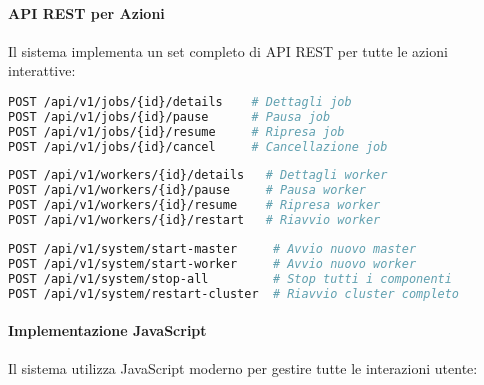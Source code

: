 \documentclass[12pt,a4paper]{article}
\begin{document}
\paragraph{API REST per Azioni}
Il sistema implementa un set completo di API REST per tutte le azioni interattive:

\begin{lstlisting}[language=bash, caption=API Endpoints per Azioni Job]
POST /api/v1/jobs/{id}/details    # Dettagli job
POST /api/v1/jobs/{id}/pause      # Pausa job
POST /api/v1/jobs/{id}/resume     # Ripresa job
POST /api/v1/jobs/{id}/cancel     # Cancellazione job
\end{lstlisting}

\begin{lstlisting}[language=bash, caption=API Endpoints per Azioni Worker]
POST /api/v1/workers/{id}/details   # Dettagli worker
POST /api/v1/workers/{id}/pause     # Pausa worker
POST /api/v1/workers/{id}/resume    # Ripresa worker
POST /api/v1/workers/{id}/restart   # Riavvio worker
\end{lstlisting}

\begin{lstlisting}[language=bash, caption=API Endpoints per Controllo Sistema]
POST /api/v1/system/start-master     # Avvio nuovo master
POST /api/v1/system/start-worker     # Avvio nuovo worker
POST /api/v1/system/stop-all         # Stop tutti i componenti
POST /api/v1/system/restart-cluster  # Riavvio cluster completo
\end{lstlisting}

\paragraph{Implementazione JavaScript}
Il sistema utilizza JavaScript moderno per gestire tutte le interazioni utente:
\end{document}
